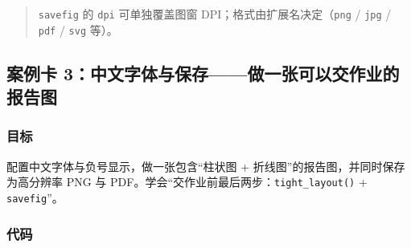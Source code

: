 \begin{Shaded}
\begin{Highlighting}[]

\OperatorTok{=}\NormalTok{(}\NormalTok{, }\OperatorTok{=}\NormalTok{)}
\NormalTok{plt.plot([}\NormalTok{, }\NormalTok{, }\NormalTok{], [}\NormalTok{, }\NormalTok{, }\NormalTok{])}
\OperatorTok{=}\NormalTok{)}
\NormalTok{(}\NormalTok{))}
\end{Highlighting}
\end{Shaded}

\begin{Shaded}
\begin{Highlighting}[]
\end{Highlighting}
\end{Shaded}

\begin{quote}
\texttt{savefig} 的 \texttt{dpi} 可单独覆盖图窗
DPI；格式由扩展名决定（\texttt{png} / \texttt{jpg} / \texttt{pdf} /
\texttt{svg} 等）。
\end{quote}

\subsection{案例卡
3：中文字体与保存------做一张可以交作业的报告图}\label{ux6848ux4f8bux5361-3ux4e2dux6587ux5b57ux4f53ux4e0eux4fddux5b58ux505aux4e00ux5f20ux53efux4ee5ux4ea4ux4f5cux4e1aux7684ux62a5ux544aux56fe}

\subsubsection{目标}\label{ux76eeux6807-22}

配置中文字体与负号显示，做一张包含``柱状图 +
折线图''的报告图，并同时保存为高分辨率 PNG 与
PDF。学会``交作业前最后两步：\texttt{tight\_layout()} +
\texttt{savefig}''。

\subsubsection{代码}\label{ux4ee3ux7801-23}

